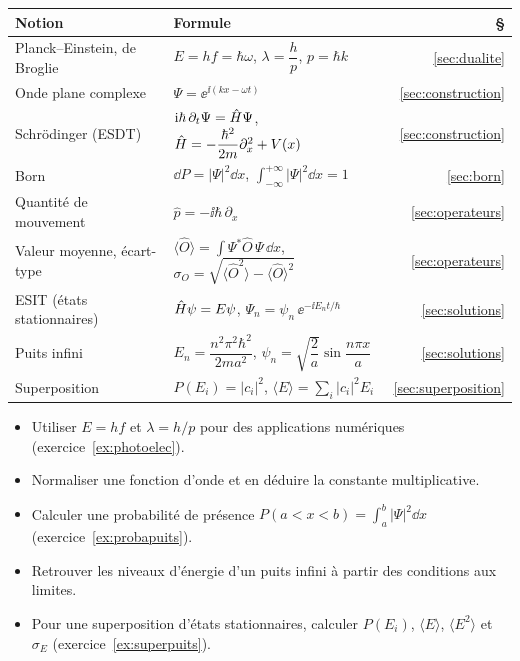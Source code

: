 \begin{center}
\renewcommand{\arraystretch}{1.45}
\begin{tabular}{@{}l l r@{}}
\toprule
\textbf{Notion} & \textbf{Formule} & \textbf{§} \\
\midrule
Planck--Einstein, de Broglie & $E=hf=\hbar\omega$, \quad $\lambda=\dfrac hp$, \quad $p=\hbar k$
  & \ref{sec:dualite} \\
Onde plane complexe & $\Psi=\ee^{\ii(kx-\omega t)}$ & \ref{sec:construction} \\
Schrödinger (ESDT) & $\mathrm{i}\hbar\,\partial_t\Psi=\hat{H}\Psi$, \quad
  $\hat{H}=-\dfrac{\hbar^2}{2m}\partial_x^2+V(x)$ & \ref{sec:construction} \\
Born & $\dd P=|\Psi|^2\dd x$, \quad $\displaystyle\int_{-\infty}^{+\infty}|\Psi|^2\dd x=1$
  & \ref{sec:born} \\
Quantité de mouvement & $\hat p=-\ii\hbar\,\partial_x$ & \ref{sec:operateurs} \\
Valeur moyenne, écart-type & $\displaystyle\langle\hat O\rangle=\int\Psi^*\hat O\,\Psi\,\dd x$,
  \quad $\sigma_O=\sqrt{\langle\hat O^2\rangle-\langle\hat O\rangle^2}$ & \ref{sec:operateurs} \\
ESIT (états stationnaires) & $\hat{H}\psi=E\psi$, \quad $\Psi_n=\psi_n\,\ee^{-\ii E_nt/\hbar}$
  & \ref{sec:solutions} \\
Puits infini & $E_n=\dfrac{n^2\pi^2\hbar^2}{2ma^2}$, \quad
  $\psi_n=\sqrt{\dfrac2a}\sin\dfrac{n\pi x}{a}$ & \ref{sec:solutions} \\
Superposition & $P(E_i)=|c_i|^2$, \quad $\langle E\rangle=\sum_i|c_i|^2E_i$
  & \ref{sec:superposition} \\
\bottomrule
\end{tabular}
\end{center}

\begin{savoirfaire}
\begin{itemize}
  \item Utiliser $E=hf$ et $\lambda=h/p$ pour des applications numériques
        (exercice~\ref{ex:photoelec}).
  \item Normaliser une fonction d'onde et en déduire la constante multiplicative.
  \item Calculer une probabilité de présence $P(a<x<b)=\int_a^b|\Psi|^2\dd x$
        (exercice~\ref{ex:probapuits}).
  \item Retrouver les niveaux d'énergie d'un puits infini à partir des conditions aux limites.
  \item Pour une superposition d'états stationnaires, calculer $P(E_i)$, $\langle E\rangle$,
        $\langle E^2\rangle$ et $\sigma_E$ (exercice~\ref{ex:superpuits}).
\end{itemize}
\end{savoirfaire}
